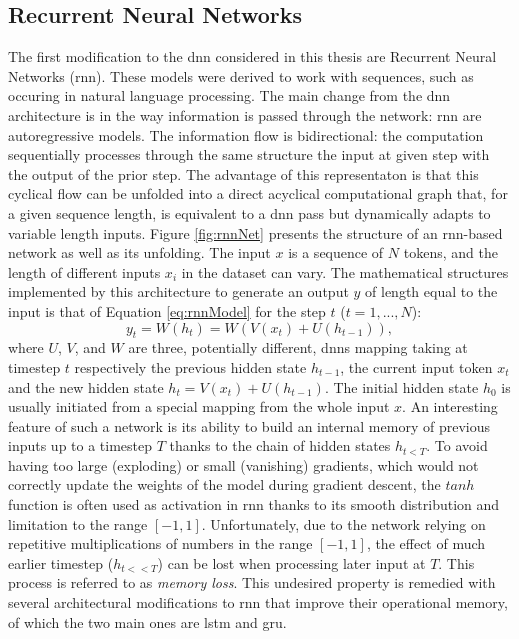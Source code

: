 \subsection{Recurrent Neural Networks}\label{sec:RNN}
The first modification to the \gls{dnn} considered in this thesis are Recurrent Neural Networks (\gls{rnn}). These models were derived to work with sequences, such as occuring in natural language processing. The main change from the \gls{dnn} architecture is in the way information is passed through the network: \gls{rnn} are autoregressive models. The information flow is bidirectional: the computation sequentially processes through the same structure the input at given step with the output of the prior step. The advantage of this representaton is that this cyclical flow can be unfolded into a direct acyclical computational graph that, for a given sequence length, is equivalent to a \gls{dnn} pass but dynamically adapts to variable length inputs. Figure \ref{fig:rnnNet} presents the structure of an \gls{rnn}-based network as well as its unfolding. The input $x$ is a sequence of $N$ tokens, and the length of different inputs $x_i$ in the dataset can vary. The mathematical structures implemented by this architecture to generate an output $y$ of length equal to the input is that of Equation \ref{eq:rnnModel} for the step $t$ ($t=1, ..., N$):
\begin{equation}\label{eq:rnnModel}
    y_t = W(h_t) = W(V(x_t) + U(h_{t-1})),
\end{equation}
where $U$, $V$, and $W$ are three, potentially different, \gls{dnn}s mapping taking at timestep $t$ respectively the previous hidden state $h_{t-1}$, the current input token $x_t$ and the new hidden state $h_t = V(x_t) + U(h_{t-1})$. The initial hidden state $h_0$ is usually initiated from a special mapping from the whole input $x$. An interesting feature of such a network is its ability to build an internal memory of previous inputs up to a timestep $T$ thanks to the chain of hidden states $h_{t<T}$. To avoid having too large (exploding) or small (vanishing) gradients, which would not correctly update the weights of the model during gradient descent, the $tanh$ function is often used as activation in \gls{rnn} thanks to its smooth distribution and limitation to the range $[-1, 1]$. Unfortunately, due to the network relying on repetitive multiplications of numbers in the range $[-1, 1]$, the effect of much earlier timestep ($h_{t<<T}$) can be lost when processing later input at $T$. This process is referred to as \textit{memory loss}. This undesired property is remedied with several  architectural modifications to \gls{rnn} that improve their operational memory, of which the two main ones are \gls{lstm} and \gls{gru}.

